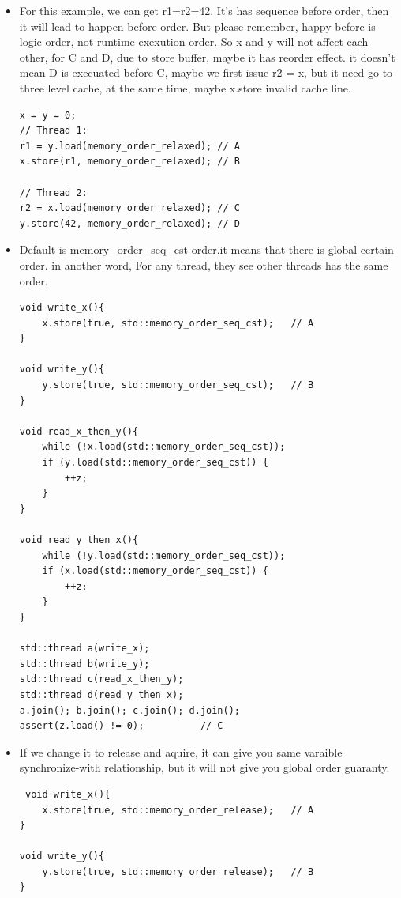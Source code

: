 \documentclass[a4paper,11pt,twoside]{book}
\begin{document}
\begin{itemize}
		\item For this example, we can get r1=r2=42. It's has sequence before order, then it will lead to happen before order. But please remember, happy before is logic order, not runtime exexution order. So x and y will not affect each other, for C and D, due to store buffer, maybe it has reorder effect. it doesn't mean D is execuated before C, maybe we first issue r2 = x, but it need go to three level cache, at the same time, maybe x.store invalid cache line. 

\begin{lstlisting}
x = y = 0;
// Thread 1:
r1 = y.load(memory_order_relaxed); // A
x.store(r1, memory_order_relaxed); // B

// Thread 2:
r2 = x.load(memory_order_relaxed); // C
y.store(42, memory_order_relaxed); // D
\end{lstlisting}


\item Default is memory\_order\_seq\_cst order.it means that there is global certain order. in another word, For any thread, they see other threads has the same order.  


\begin{lstlisting}
void write_x(){
    x.store(true, std::memory_order_seq_cst);	// A
}
 
void write_y(){
    y.store(true, std::memory_order_seq_cst);	// B
}
 
void read_x_then_y(){
    while (!x.load(std::memory_order_seq_cst));
    if (y.load(std::memory_order_seq_cst)) {
        ++z;
    }
}
 
void read_y_then_x(){
    while (!y.load(std::memory_order_seq_cst));
    if (x.load(std::memory_order_seq_cst)) {
        ++z;
    }
}
 
std::thread a(write_x);
std::thread b(write_y);
std::thread c(read_x_then_y);
std::thread d(read_y_then_x);
a.join(); b.join(); c.join(); d.join();
assert(z.load() != 0);			// C
\end{lstlisting}

\item If we change it to release and aquire, it can give you same varaible synchronize-with relationship, but it will not give you global order guaranty.  

\begin{lstlisting}
 void write_x(){
    x.store(true, std::memory_order_release);	// A
}
 
void write_y(){
    y.store(true, std::memory_order_release);	// B
}
 

\end{lstlisting}
\end{itemize}
\end{document}
